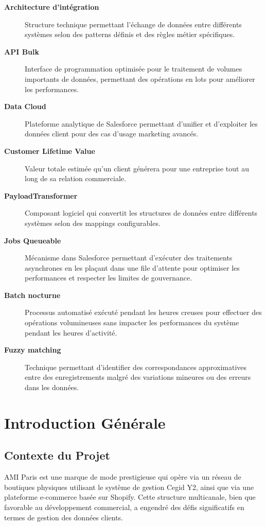 \documentclass[12pt,a4paper,openany,oneside]{report}
\begin{document}
\begin{description}
    \item[\textbf{Architecture d'intégration}] Structure technique permettant l'échange de données entre différents systèmes selon des patterns définis et des règles métier spécifiques.
    
    \item[\textbf{API Bulk}] Interface de programmation optimisée pour le traitement de volumes importants de données, permettant des opérations en lots pour améliorer les performances.
    
    \item[\textbf{Data Cloud}] Plateforme analytique de Salesforce permettant d'unifier et d'exploiter les données client pour des cas d'usage marketing avancés.
    
    \item[\textbf{Customer Lifetime Value}] Valeur totale estimée qu'un client générera pour une entreprise tout au long de sa relation commerciale.
    
    \item[\textbf{PayloadTransformer}] Composant logiciel qui convertit les structures de données entre différents systèmes selon des mappings configurables.
    
    \item[\textbf{Jobs Queueable}] Mécanisme dans Salesforce permettant d'exécuter des traitements asynchrones en les plaçant dans une file d'attente pour optimiser les performances et respecter les limites de gouvernance.
    
    \item[\textbf{Batch nocturne}] Processus automatisé exécuté pendant les heures creuses pour effectuer des opérations volumineuses sans impacter les performances du système pendant les heures d'activité.
    
    \item[\textbf{Fuzzy matching}] Technique permettant d'identifier des correspondances approximatives entre des enregistrements malgré des variations mineures ou des erreurs dans les données.
\end{description}

\clearpage


\chapter{Introduction Générale}
\section{Contexte du Projet}
AMI Paris est une marque de mode prestigieuse qui opère via un réseau de boutiques physiques utilisant le système de gestion Cegid Y2, ainsi que via une plateforme e-commerce basée sur Shopify. Cette structure multicanale, bien que favorable au développement commercial, a engendré des défis significatifs en termes de gestion des données clients.
\end{document}
